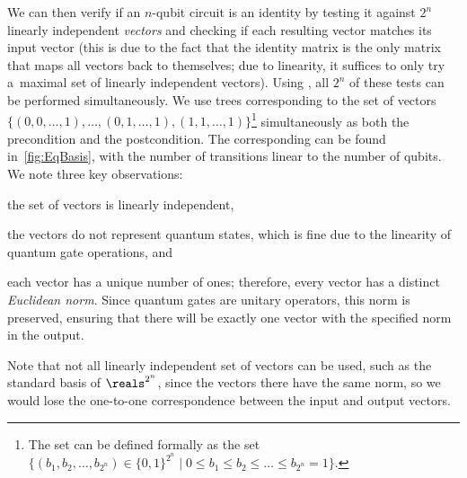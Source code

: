 We can then verify if an $n$-qubit circuit is an identity by testing it against
$2^n$ linearly independent \emph{vectors} and checking if each resulting vector
matches its input vector (this is due to the fact that the identity matrix is the
only matrix that maps all vectors back to themselves; due to linearity, it
suffices to only try a~maximal set of linearly independent vectors).
Using \lstas, all $2^n$ of these tests can be performed simultaneously. 
We use trees corresponding to the set of vectors $\{(0,0,\ldots,1),\ldots,(0,1,\ldots,1), (1,1,\ldots,1)\}$\footnote{The set can be defined formally as the set $\{(b_1, b_2, \ldots, b_{2^n}) \in \{0,1\}^{2^n} \mid 0\leq b_1 \leq b_2 \leq \ldots \leq b_{2^n} = 1\}$.} simultaneously as both the precondition and the postcondition.
The corresponding \lsta can be found in~\cref{fig:EqBasis}, with the number of transitions linear to the number of qubits. We note three key observations: 
\begin{inparaenum}[(i)]
\item the set of vectors is linearly independent, 
\item the vectors do not represent quantum states, which is fine due to the linearity of quantum gate operations, and
\item each vector has a unique number of ones; therefore, every vector has a distinct \emph{Euclidean norm}. Since quantum gates are unitary operators, this norm is preserved, ensuring that there will be exactly one vector with the specified norm in the output. 
\end{inparaenum}
Note that not all linearly independent set of vectors can be used, such as the
standard basis of $\reals^{2^n}$, since the vectors there have the same norm, so
we would lose the one-to-one correspondence between the input and output vectors.



